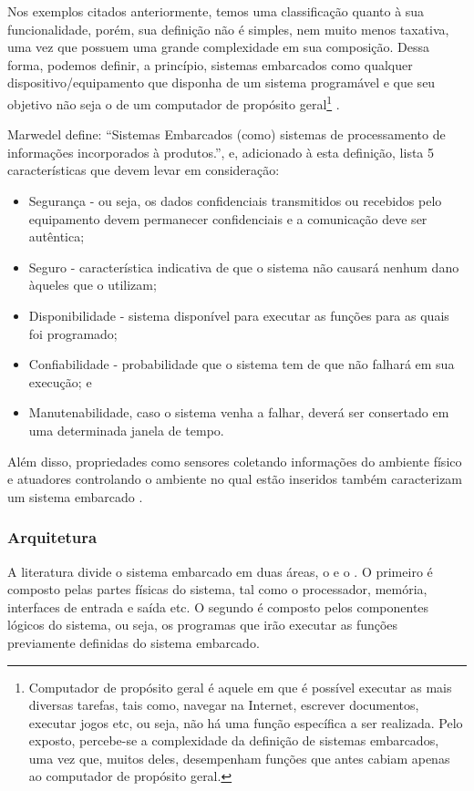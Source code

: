 Nos exemplos citados anteriormente, temos uma classificação quanto à sua
funcionalidade, porém, sua definição não é simples, nem muito menos taxativa,
uma vez que possuem uma grande complexidade em sua composição. Dessa forma,
podemos definir, a princípio, sistemas embarcados como qualquer
dispositivo/equipamento que disponha de um sistema programável e que seu
objetivo não seja o de um computador de propósito geral\footnote{Computador de
propósito geral é aquele em que é possível executar as mais diversas tarefas,
tais como, navegar na Internet, escrever documentos, executar jogos etc, ou
seja, não há uma função específica a ser realizada. Pelo exposto, percebe-se a
complexidade da definição de sistemas embarcados, uma vez que, muitos deles, 
desempenham funções que antes cabiam apenas ao computador de propósito geral.}
\cite{wolf2012computers}.

Marwedel define: ``Sistemas Embarcados (como) sistemas de processamento de
informações incorporados à produtos.'', e, adicionado à esta definição, lista 5
características que devem levar em consideração: 

\begin{itemize}
  \item Segurança - ou seja, os dados confidenciais transmitidos ou recebidos pelo
  equipamento devem permanecer confidenciais e a comunicação deve ser autêntica;
  \item Seguro - característica indicativa de que o sistema não causará nenhum dano àqueles que o utilizam;
  \item Disponibilidade - sistema disponível para executar as funções para as quais
  foi programado; 
  \item Confiabilidade - probabilidade que o sistema tem de que não
  falhará em sua execução; e
  \item Manutenabilidade, caso o sistema venha a falhar, deverá 
  ser consertado em uma determinada janela de tempo.
\end{itemize}

Além disso, propriedades como sensores coletando informações do ambiente
físico e atuadores controlando o ambiente no qual estão inseridos também
caracterizam um sistema embarcado \cite{marwedel2010embedded}.

\subsubsection{Arquitetura}\label{subsubsec:arquitetura}

A literatura divide o sistema embarcado em duas áreas, o \hardware[] e o 
\software. O primeiro é composto pelas partes físicas do sistema, 
tal como o processador, memória, interfaces de entrada e saída etc. O segundo é
composto pelos componentes lógicos do sistema, ou seja, os programas que 
irão executar as funções previamente definidas do sistema embarcado.

